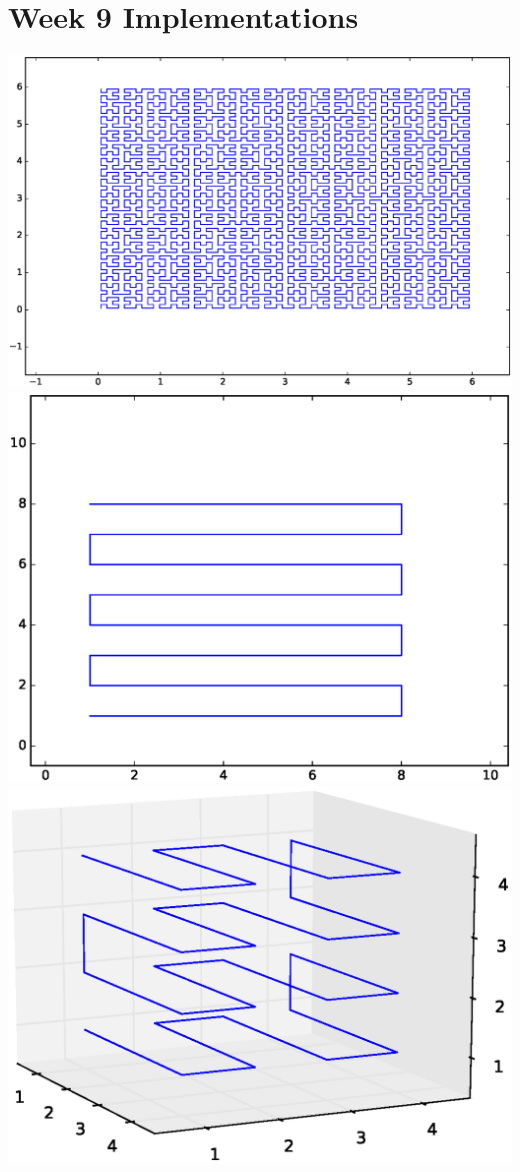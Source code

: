 \documentclass[10pt]{article}
\begin{document}
\section{Week 9 Implementations}
\includegraphics[scale=0.55]{hilbert_n6.eps}\\
\includegraphics[scale=0.4]{scan_coding.eps}
\includegraphics[scale=0.4]{scan_code_3d.eps}


\nocite{*}


\end{document}
